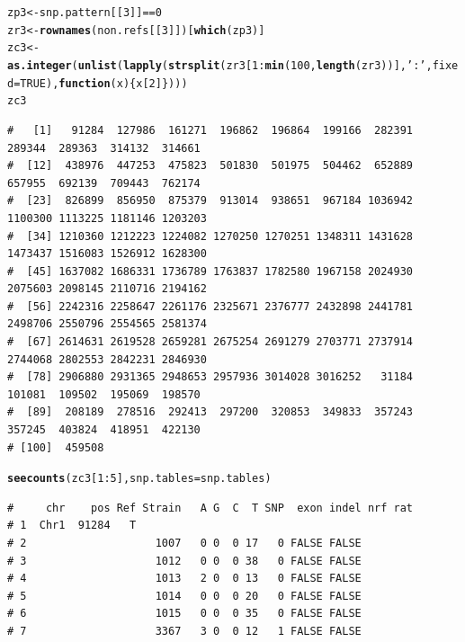 \documentclass{article}\usepackage[]{graphicx}\usepackage[]{color}
\makeatletter
\newcommand{\hlnum}[1]{\textcolor[rgb]{0.686,0.059,0.569}{#1}}%
\newcommand{\hlstr}[1]{\textcolor[rgb]{0.192,0.494,0.8}{#1}}%
\newcommand{\hlopt}[1]{\textcolor[rgb]{0,0,0}{#1}}%
\newcommand{\hlstd}[1]{\textcolor[rgb]{0.345,0.345,0.345}{#1}}%
\newcommand{\hlkwa}[1]{\textcolor[rgb]{0.161,0.373,0.58}{\textbf{#1}}}%
\newcommand{\hlkwb}[1]{\textcolor[rgb]{0.69,0.353,0.396}{#1}}%
\newcommand{\hlkwc}[1]{\textcolor[rgb]{0.333,0.667,0.333}{#1}}%
\newcommand{\hlkwd}[1]{\textcolor[rgb]{0.737,0.353,0.396}{\textbf{#1}}}%
\newenvironment{kframe}{%
 \def\at@end@of@kframe{}%
 \ifinner\ifhmode%
  \def\at@end@of@kframe{\end{minipage}}%
  \begin{minipage}{\columnwidth}%
 \fi\fi%
 \def\FrameCommand##1{\hskip\@totalleftmargin \hskip-\fboxsep
 \colorbox{shadecolor}{##1}\hskip-\fboxsep
     \hskip-\linewidth \hskip-\@totalleftmargin \hskip\columnwidth}%
 \MakeFramed {\advance\hsize-\width
   \@totalleftmargin\z@ \linewidth\hsize
   \@setminipage}}%
 {\par\unskip\endMakeFramed%
 \at@end@of@kframe}
\newenvironment{knitrout}{}{} %
\makeatother
\begin{document}
\begin{knitrout}\footnotesize
{}\color{fgcolor}\begin{kframe}
\begin{alltt}
\hlstd{zp3} \hlkwb{<-} \hlstd{snp.pattern[[}\hlnum{3}\hlstd{]]} \hlopt{==} \hlnum{0}
\hlstd{zr3} \hlkwb{<-} \hlkwd{rownames}\hlstd{(non.refs[[}\hlnum{3}\hlstd{]])[}\hlkwd{which}\hlstd{(zp3)]}
\hlstd{zc3} \hlkwb{<-} \hlkwd{as.integer}\hlstd{(}\hlkwd{unlist}\hlstd{(}\hlkwd{lapply}\hlstd{(}\hlkwd{strsplit}\hlstd{(zr3[}\hlnum{1}\hlopt{:}\hlkwd{min}\hlstd{(}\hlnum{100}\hlstd{,}\hlkwd{length}\hlstd{(zr3))],}\hlstr{':'}\hlstd{,}\hlkwc{fixed}\hlstd{=}\hlnum{TRUE}\hlstd{),}\hlkwa{function}\hlstd{(}\hlkwc{x}\hlstd{)\{x[}\hlnum{2}\hlstd{]\})))}
\hlstd{zc3}
\end{alltt}
\begin{verbatim}
#   [1]   91284  127986  161271  196862  196864  199166  282391  289344  289363  314132  314661
#  [12]  438976  447253  475823  501830  501975  504462  652889  657955  692139  709443  762174
#  [23]  826899  856950  875379  913014  938651  967184 1036942 1100300 1113225 1181146 1203203
#  [34] 1210360 1212223 1224082 1270250 1270251 1348311 1431628 1473437 1516083 1526912 1628300
#  [45] 1637082 1686331 1736789 1763837 1782580 1967158 2024930 2075603 2098145 2110716 2194162
#  [56] 2242316 2258647 2261176 2325671 2376777 2432898 2441781 2498706 2550796 2554565 2581374
#  [67] 2614631 2619528 2659281 2675254 2691279 2703771 2737914 2744068 2802553 2842231 2846930
#  [78] 2906880 2931365 2948653 2957936 3014028 3016252   31184  101081  109502  195069  198570
#  [89]  208189  278516  292413  297200  320853  349833  357243  357245  403824  418951  422130
# [100]  459508
\end{verbatim}
\begin{alltt}
\hlkwd{seecounts}\hlstd{(zc3[}\hlnum{1}\hlopt{:}\hlnum{5}\hlstd{],} \hlkwc{snp.tables}\hlstd{=snp.tables)}
\end{alltt}
\begin{verbatim}
#     chr    pos Ref Strain   A G  C  T SNP  exon indel nrf rat
# 1  Chr1  91284   T                                           
# 2                    1007   0 0  0 17   0 FALSE FALSE        
# 3                    1012   0 0  0 38   0 FALSE FALSE        
# 4                    1013   2 0  0 13   0 FALSE FALSE        
# 5                    1014   0 0  0 20   0 FALSE FALSE        
# 6                    1015   0 0  0 35   0 FALSE FALSE        
# 7                    3367   3 0  0 12   1 FALSE FALSE        

\end{verbatim}
\end{kframe}
\end{knitrout}
\end{document}
